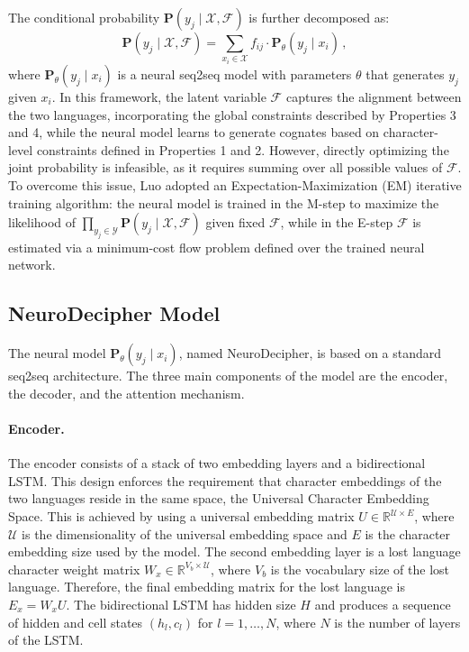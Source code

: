The conditional probability $\mathbf{P}(y_j \mid \mathcal{X}, \mathcal{F})$ is further decomposed as:
\[
\mathbf{P}(y_j \mid \mathcal{X}, \mathcal{F})
= \sum_{x_i\in \mathcal{X}} f_{ij}\cdot \mathbf{P}_{\theta}(y_j \mid x_i) \, ,
\]
where $\mathbf{P}_{\theta}(y_j \mid x_i)$ is a neural seq2seq model with parameters $\theta$ that generates $y_j$ given $x_i$.
In this framework, the latent variable $\mathcal{F}$ captures the alignment between the two languages, incorporating the global constraints described by Properties 3 and 4, while the neural model learns to generate cognates based on character-level constraints defined in Properties 1 and 2.
However, directly optimizing the joint probability is infeasible, as it requires summing over all possible values of $\mathcal{F}$.
To overcome this issue, Luo adopted an Expectation-Maximization (EM) iterative training algorithm: the neural model is trained in the M-step to maximize the likelihood of $\prod_{y_j\in \mathcal{Y}} \mathbf{P}(y_j \mid \mathcal{X}, \mathcal{F})$ given fixed $\mathcal{F}$, while in the E-step $\mathcal{F}$ is estimated via a minimum-cost flow problem defined over the trained neural network.

\subsection{NeuroDecipher Model} \label{sec:neurodecipher}
The neural model $\mathbf{P}_{\theta}(y_j \mid x_i)$, named NeuroDecipher, is based on a standard seq2seq architecture.
The three main components of the model are the encoder, the decoder, and the attention mechanism.

\paragraph{Encoder.}
The encoder consists of a stack of two embedding layers and a bidirectional LSTM.
This design enforces the requirement that character embeddings of the two languages reside in the same space, the Universal Character Embedding Space.
This is achieved by using a universal embedding matrix $U\in\mathbb{R}^{\mathcal{U}\times E}$, where $\mathcal{U}$ is the dimensionality of the universal embedding space and $E$ is the character embedding size used by the model.
The second embedding layer is a lost language character weight matrix $W_x\in\mathbb{R}^{V_b\times \mathcal{U}}$, where $V_b$ is the vocabulary size of the lost language.
Therefore, the final embedding matrix for the lost language is $E_x = W_x U$.
The bidirectional LSTM has hidden size $H$ and produces a sequence of hidden and cell states $(h_l,c_l)$ for $l=1,\ldots,N$, where $N$ is the number of layers of the LSTM.

